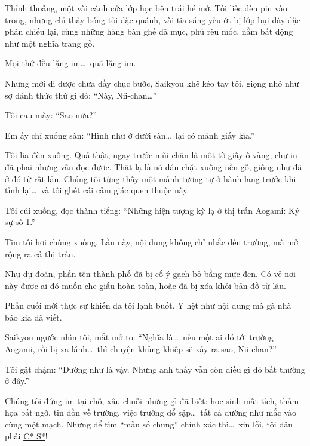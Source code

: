 \documentclass[../main.tex]{subfiles}
\begin{document}
Thỉnh thoảng, một vài cánh cửa lớp học bên trái hé mở. Tôi liếc đèn pin vào trong, nhưng chỉ thấy bóng tối đặc quánh, vài tia sáng yếu ớt bị lớp bụi dày đặc phản chiếu lại, cùng những hàng bàn ghế đã mục, phủ rêu mốc, nằm bất động như một nghĩa trang gỗ.

Mọi thứ đều lặng im\dots\ quá lặng im.

Nhưng mới đi được chưa đầy chục bước, Saikyou khẽ kéo tay tôi, giọng nhỏ như sợ đánh thức thứ gì đó: ``Này, Nii-chan\dots''

Tôi cau mày: ``Sao nữa?''

Em ấy chỉ xuống sàn: ``Hình như ở dưới sàn\dots\ lại có mảnh giấy kìa.''

Tôi lia đèn xuống. Quả thật, ngay trước mũi chân là một tờ giấy ố vàng, chữ in đã phai nhưng vẫn đọc được. Thật lạ là nó dán chặt xuống nền gỗ, giống như đã ở đó từ rất lâu. Chúng tôi từng thấy một mảnh tương tự ở hành lang trước khi tỉnh lại\dots\ và tôi ghét cái cảm giác quen thuộc này.

Tôi cúi xuống, đọc thành tiếng: ``{\vnmsans Những hiện tượng kỳ lạ ở thị trấn Aogami: Ký sự số 1.}''

Tim tôi hơi chùng xuống. Lần này, nội dung không chỉ nhắc đến trường, mà mở rộng ra cả thị trấn.


Như dự đoán, phần tên thành phố đã bị cố ý gạch bỏ bằng mực đen. Có vẻ nơi này được ai đó muốn che giấu hoàn toàn, hoặc đã bị xóa khỏi bản đồ từ lâu.


Phần cuối mới thực sự khiến da tôi lạnh buốt. Y hệt như nội dung mà gã nhà báo kia đã viết.

Saikyou ngước nhìn tôi, mắt mở to: ``Nghĩa là\dots\ nếu một ai đó tới trường Aogami, rồi bị xa lánh\dots\ thì chuyện khủng khiếp sẽ xảy ra sao, Nii-chan?''

Tôi gật chậm: ``Dường như là vậy. Nhưng anh thấy vẫn còn điều gì đó bất thường ở đây.''

Chúng tôi đứng im tại chỗ, xâu chuỗi những gì đã biết: học sinh mất tích, thảm họa bất ngờ, tin đồn về trường, việc trường đổ sập\dots\  tất cả dường như mắc vào cùng một mạch. Nhưng để tìm ``mẫu số chung'' chính xác thì\dots\ xin lỗi, tôi đâu phải \href{https://www.youtube.com/@cosu}{C* S*}!
\end{document}
